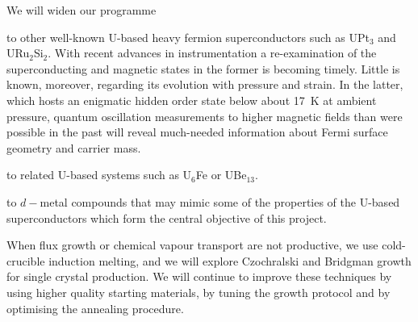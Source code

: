 \vspace{0.5em}
\noindent 
We will widen our  programme
\begin{leftlist}
\item to other well-known U-based heavy fermion superconductors such as UPt$_3$ and URu$_2$Si$_2$. With recent advances in instrumentation a re-examination of the superconducting and magnetic states in the former is becoming timely. Little is known, moreover, regarding its evolution with pressure and strain. In the latter, which hosts an enigmatic hidden order state below about \SI{17}{\kelvin} at ambient pressure, quantum oscillation measurements to higher magnetic fields than were possible in the past will reveal much-needed information about Fermi surface geometry and carrier mass. 
\item to related U-based systems such as U$_6$Fe or UBe$_{13}$. %
\item to 
 $d-$metal compounds that may mimic some of the properties of the U-based superconductors which form the central objective of this project.
\end{leftlist}
When flux growth or chemical vapour transport are not productive, we use cold-crucible %
induction melting, and we will
explore Czochralski and Bridgman growth for single crystal production. We will continue to improve these techniques by using higher quality starting materials, by tuning the growth protocol and by optimising the annealing procedure.  


